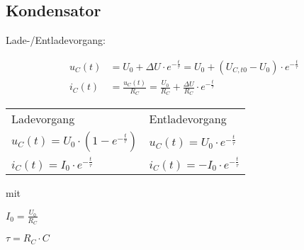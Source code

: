 \begin{sectionbox}
	\subsection{Kondensator}

	Lade-/Entladevorgang:
	\begin{emphbox}
		\begin{align*}
			u_C(t) &= U_0+ ΔU \cdot e^{-{\frac{t}{τ}}} = U_0+ (U_{C,t0}-U_0) \cdot e^{-{\frac{t}{τ}}} \\
			i_C(t) &= \frac{u_C(t)}{R_C} = \frac{U_0}{R_C}+\frac{ΔU}{R_C}\cdot e^{-{\frac{t}{τ}}}
		\end{align*}
	\end{emphbox}




\begin{emphbox}
	\begin{tabular}{l|l}
		Ladevorgang & Entladevorgang \\
		
		$ u_C(t) = U_0 \cdot (1-e^{-{\frac{t}{τ}}}) $ &
		$ u_C(t) = U_0 \cdot e^{-{\frac{t}{τ}}} $ \\

		$ i_C(t) = I_0 \cdot e^{-{\frac{t}{τ}}} $ &
		$ i_C(t) = -I_0 \cdot e^{-{\frac{t}{τ}}} $ \\
		
	\end{tabular}



\end{emphbox}

mit
\begin{emphbox}
	$I_0 = \frac{U_0}{R_C}$
	
	$τ = R_C \cdot C$
\end{emphbox}

	
\end{sectionbox}

